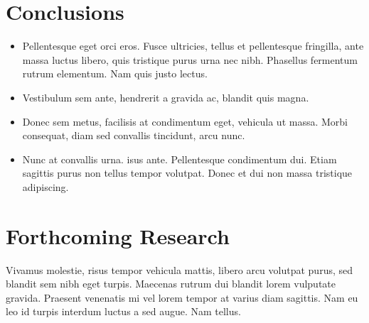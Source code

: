 \documentclass[a0,landscape]{a0poster}
\begin{document}
\begin{multicols}{4}
    \color{SaddleBrown} %

    \section*{Conclusions}

    \begin{itemize}
        \item Pellentesque eget orci eros. Fusce ultricies, tellus et pellentesque fringilla, ante massa luctus libero, quis tristique purus urna nec nibh. Phasellus fermentum rutrum elementum. Nam quis justo lectus.
        \item Vestibulum sem ante, hendrerit a gravida ac, blandit quis magna.
        \item Donec sem metus, facilisis at condimentum eget, vehicula ut massa. Morbi consequat, diam sed convallis tincidunt, arcu nunc.
        \item Nunc at convallis urna. isus ante. Pellentesque condimentum dui. Etiam sagittis purus non tellus tempor volutpat. Donec et dui non massa tristique adipiscing.
    \end{itemize}

    \color{DarkSlateGray} %


    \section*{Forthcoming Research}

    Vivamus molestie, risus tempor vehicula mattis, libero arcu volutpat purus, sed blandit sem nibh eget turpis. Maecenas rutrum dui blandit lorem vulputate gravida. Praesent venenatis mi vel lorem tempor at varius diam sagittis. Nam eu leo id turpis interdum luctus a sed augue. Nam tellus.


    \nocite{*} %


\end{multicols}
\end{document}
